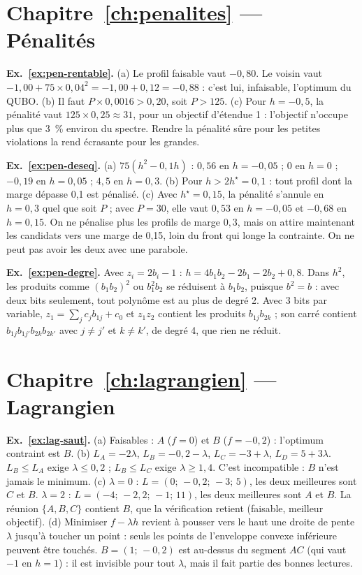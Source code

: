 \section*{Chapitre~\ref{ch:penalites} — Pénalités}
\textbf{Ex.~\ref{ex:pen-rentable}.} (a) Le profil faisable vaut $-0{,}80$. Le voisin vaut $-1{,}00+75\times0{,}04^2=-1{,}00+0{,}12=-0{,}88$ : c'est lui, infaisable, l'optimum du QUBO. (b) Il faut $P\times0{,}0016>0{,}20$, soit $P>125$. (c) Pour $h=-0{,}5$, la pénalité vaut $125\times0{,}25\approx31$, pour un objectif d'étendue 1 : l'objectif n'occupe plus que 3~\% environ du spectre. Rendre la pénalité sûre pour les petites violations la rend écrasante pour les grandes.

\textbf{Ex.~\ref{ex:pen-deseq}.} (a) $75(h^2-0{,}1h)$ : $0{,}56$ en $h=-0{,}05$ ; $0$ en $h=0$ ; $-0{,}19$ en $h=0{,}05$ ; $4{,}5$ en $h=0{,}3$. (b) Pour $h>2h^\star=0{,}1$ : tout profil dont la marge dépasse 0,1 est pénalisé. (c) Avec $h^\star=0{,}15$, la pénalité s'annule en $h=0{,}3$ quel que soit $P$ ; avec $P=30$, elle vaut $0{,}53$ en $h=-0{,}05$ et $-0{,}68$ en $h=0{,}15$. On ne pénalise plus les profils de marge $0{,}3$, mais on attire maintenant les candidats vers une marge de 0,15, loin du front qui longe la contrainte. On ne peut pas avoir les deux avec une parabole.

\textbf{Ex.~\ref{ex:pen-degre}.} Avec $z_i=2b_i-1$ : $h=4b_1b_2-2b_1-2b_2+0{,}8$. Dans $h^2$, les produits comme $(b_1b_2)^2$ ou $b_1^2b_2$ se réduisent à $b_1b_2$, puisque $b^2=b$ : avec deux bits seulement, tout polynôme est au plus de degré 2. Avec 3 bits par variable, $z_1=\sum_jc_jb_{1j}+c_0$ et $z_1z_2$ contient les produits $b_{1j}b_{2k}$ ; son carré contient $b_{1j}b_{1j'}b_{2k}b_{2k'}$ avec $j\ne j'$ et $k\ne k'$, de degré 4, que rien ne réduit.

\section*{Chapitre~\ref{ch:lagrangien} — Lagrangien}
\textbf{Ex.~\ref{ex:lag-saut}.} (a) Faisables : $A$ ($f=0$) et $B$ ($f=-0{,}2$) : l'optimum contraint est $B$. (b) $L_A=-2\lambda$, $L_B=-0{,}2-\lambda$, $L_C=-3+\lambda$, $L_D=5+3\lambda$. $L_B\le L_A$ exige $\lambda\le0{,}2$ ; $L_B\le L_C$ exige $\lambda\ge1{,}4$. C'est incompatible : $B$ n'est jamais le minimum. (c) $\lambda=0$ : $L=(0;\,-0{,}2;\,-3;\,5)$, les deux meilleures sont $C$ et $B$. $\lambda=2$ : $L=(-4;\,-2{,}2;\,-1;\,11)$, les deux meilleures sont $A$ et $B$. La réunion $\{A,B,C\}$ contient $B$, que la vérification retient (faisable, meilleur objectif). (d) Minimiser $f-\lambda h$ revient à pousser vers le haut une droite de pente $\lambda$ jusqu'à toucher un point : seuls les points de l'enveloppe convexe inférieure peuvent être touchés. $B=(1;\,-0{,}2)$ est au-dessus du segment $AC$ (qui vaut $-1$ en $h=1$) : il est invisible pour tout $\lambda$, mais il fait partie des bonnes lectures.

